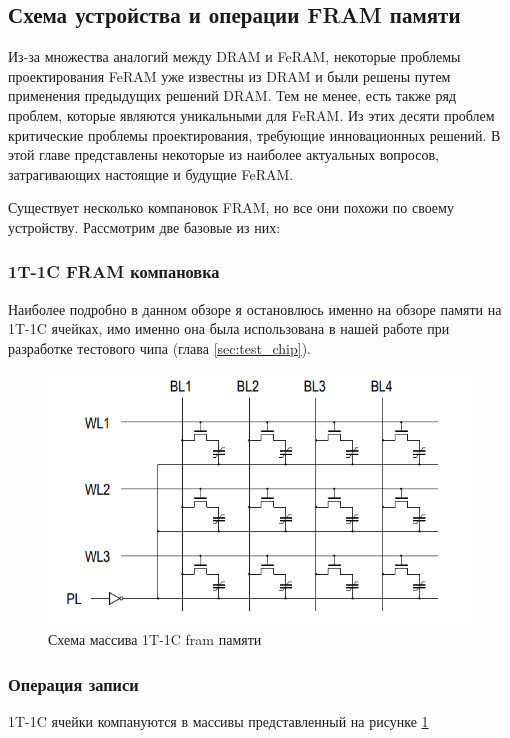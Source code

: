 \documentclass[a4paper,12pt]{article} %
\begin{document}
\subsection{Схема устройства и операции FRAM памяти}

Из-за множества аналогий между DRAM и FeRAM, некоторые проблемы проектирования FeRAM уже известны из DRAM и были решены путем применения предыдущих решений DRAM. Тем не менее, есть также ряд проблем, которые являются уникальными для FeRAM. Из этих десяти проблем критические проблемы проектирования, требующие инновационных решений. В этой главе представлены некоторые из наиболее актуальных вопросов, затрагивающих настоящие и будущие FeRAM.





Существует несколько компановок FRAM, но все они похожи по своему устройству. Рассмотрим две базовые из них:
\subsubsection{1T-1C FRAM компановка}
Наиболее подробно в данном обзоре я остановлюсь именно на обзоре памяти на 1T-1C ячейках, имо именно она была использована в нашей работе при разработке тестового чипа (глава \ref{sec:test_chip}). 



   \begin{figure}[H]
  \includegraphics[width=\textwidth]{FRAM_array.png}
  \caption{Схема массива 1T-1C fram памяти}
  \label{pic:fram_array}
  \end{figure}







\subsubsection{Операция записи}
1T-1C ячейки компануются в массивы представленный на рисунке \ref{pic:fram_array} 
\end{document}
